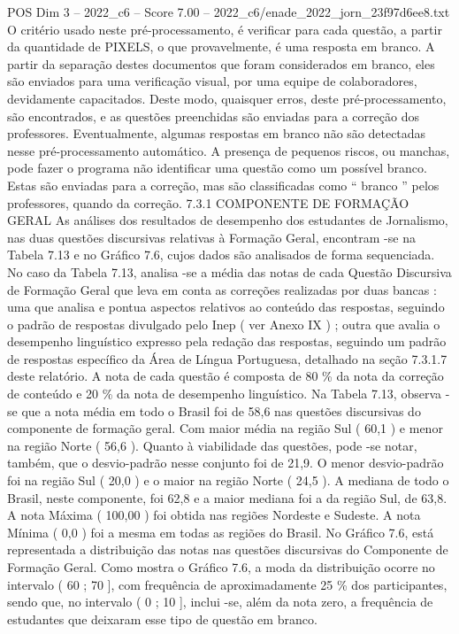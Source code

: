 \begin{textsample}{POS Dim 3 – 2022\_c6 – Score 7.00 – 2022\_c6/enade\_2022\_jorn\_23f97d6ee8.txt}
O critério usado neste pré-processamento, é verificar para cada questão, a partir da quantidade de PIXELS, o que provavelmente, é uma resposta em branco.
A partir da separação destes documentos que foram considerados em branco, eles são enviados para uma verificação visual, por uma equipe de colaboradores, devidamente capacitados.
Deste modo, quaisquer erros, deste pré-processamento, são encontrados, e as questões preenchidas são enviadas para a correção dos professores.
Eventualmente, algumas respostas em branco não são detectadas nesse pré-processamento automático.
A presença de pequenos riscos, ou manchas, pode fazer o programa não identificar uma questão como um possível branco.
Estas são enviadas para a correção, mas são classificadas como “ branco ” pelos professores, quando da correção. 7.3.1 COMPONENTE DE FORMAÇÃO GERAL As análises dos resultados de desempenho dos estudantes de Jornalismo, nas duas questões discursivas relativas à Formação Geral, encontram -se na Tabela 7.13 e no Gráfico 7.6, cujos dados são analisados de forma sequenciada.
No caso da Tabela 7.13, analisa -se a média das notas de cada Questão Discursiva de Formação Geral que leva em conta as correções realizadas por duas bancas : uma que analisa e pontua aspectos relativos ao conteúdo das respostas, seguindo o padrão de respostas divulgado pelo Inep ( ver Anexo IX ) ; outra que avalia o desempenho linguístico expresso pela redação das respostas, seguindo um padrão de respostas específico da Área de Língua Portuguesa, detalhado na seção 7.3.1.7 deste relatório.
A nota de cada questão é composta de 80 \% da nota da correção de conteúdo e 20 \% da nota de desempenho linguístico.
Na Tabela 7.13, observa -se que a nota média em todo o Brasil foi de 58,6 nas questões discursivas do componente de formação geral.
Com maior média na região Sul ( 60,1 ) e menor na região Norte ( 56,6 ).
Quanto à viabilidade das questões, pode -se notar, também, que o desvio-padrão nesse conjunto foi de 21,9.
O menor desvio-padrão foi na região Sul ( 20,0 ) e o maior na região Norte ( 24,5 ).
A mediana de todo o Brasil, neste componente, foi 62,8 e a maior mediana foi a da região Sul, de 63,8.
A nota Máxima ( 100,00 ) foi obtida nas regiões Nordeste e Sudeste.
A nota Mínima ( 0,0 ) foi a mesma em todas as regiões do Brasil.
No Gráfico 7.6, está representada a distribuição das notas nas questões discursivas do Componente de Formação Geral.
Como mostra o Gráfico 7.6, a moda da distribuição ocorre no intervalo ( 60 ; 70 ], com frequência de aproximadamente 25 \% dos participantes, sendo que, no intervalo ( 0 ; 10 ], inclui -se, além da nota zero, a frequência de estudantes que deixaram esse tipo de questão em branco.

\end{textsample}
